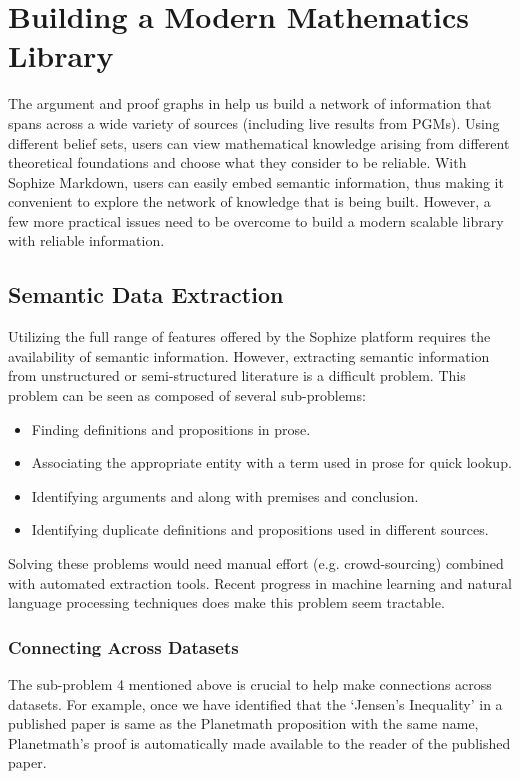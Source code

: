 \documentclass[a4paper]{article}
\begin{document}
\section{Building a Modern Mathematics Library}
The argument and proof graphs in help us build a network of information that spans across a wide variety of sources (including live results from PGMs). Using different belief sets, users can view mathematical knowledge arising from different theoretical foundations and choose what they consider to be reliable. With Sophize Markdown, users can easily embed semantic information, thus making it convenient to explore the network of knowledge that is being built. However, a few more practical issues need to be overcome to build a modern scalable library with reliable information.

\subsection{Semantic Data Extraction}
Utilizing the full range of features offered by the Sophize platform requires the availability of semantic information. However, extracting semantic information from unstructured or semi-structured literature is a difficult problem. This problem can be seen as composed of several sub-problems:
\begin{itemize}
\item Finding definitions and propositions in prose.
\item Associating the appropriate entity with a term used in prose for quick lookup.
\item Identifying arguments and along with premises and conclusion.
\item \label{prob:dup} Identifying duplicate definitions and propositions used in different sources.
\end{itemize}

Solving these problems would need manual effort (e.g. crowd-sourcing) combined with automated extraction tools. Recent progress in machine learning and natural language processing techniques does make this problem seem tractable.

\subsubsection{Connecting Across Datasets}
The sub-problem 4 mentioned above is crucial to help make connections across datasets. For example, once we have identified that the `Jensen's Inequality' in a published paper is same as the Planetmath proposition with the same name, Planetmath's proof is automatically made available to the reader of the published paper.
\end{document}
